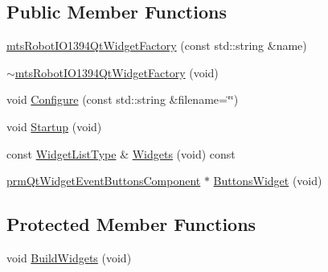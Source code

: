 \subsection*{Public Member Functions}
\begin{DoxyCompactItemize}
\item 
\hyperlink{classmts_robot_i_o1394_qt_widget_factory_a5af9f14113c1a8df00e5dcc6eec93c44}{mts\-Robot\-I\-O1394\-Qt\-Widget\-Factory} (const std\-::string \&name)
\item 
\hyperlink{classmts_robot_i_o1394_qt_widget_factory_aea31ad277310292acf320ea8551a5c29}{$\sim$mts\-Robot\-I\-O1394\-Qt\-Widget\-Factory} (void)
\item 
void \hyperlink{classmts_robot_i_o1394_qt_widget_factory_a38461e327f136bdfeb44bcc5facdc7a6}{Configure} (const std\-::string \&filename=\char`\"{}\char`\"{})
\item 
void \hyperlink{classmts_robot_i_o1394_qt_widget_factory_a39d213bdac308c273d5a6c630ea630c7}{Startup} (void)
\item 
const \hyperlink{classmts_robot_i_o1394_qt_widget_factory_aaa614e39fe48800dab4b21edf6845c22}{Widget\-List\-Type} \& \hyperlink{classmts_robot_i_o1394_qt_widget_factory_a9994bbd0f82c4a5790d048740baf34f3}{Widgets} (void) const 
\item 
\hyperlink{classprm_qt_widget_event_buttons_component}{prm\-Qt\-Widget\-Event\-Buttons\-Component} $\ast$ \hyperlink{classmts_robot_i_o1394_qt_widget_factory_ad87c9cb3b7864100eb976824a534976c}{Buttons\-Widget} (void)
\end{DoxyCompactItemize}
\subsection*{Protected Member Functions}
\begin{DoxyCompactItemize}
\item 
void \hyperlink{classmts_robot_i_o1394_qt_widget_factory_a2a585339c5e62006657cb9a0d6fc89d9}{Build\-Widgets} (void)
\end{DoxyCompactItemize}
